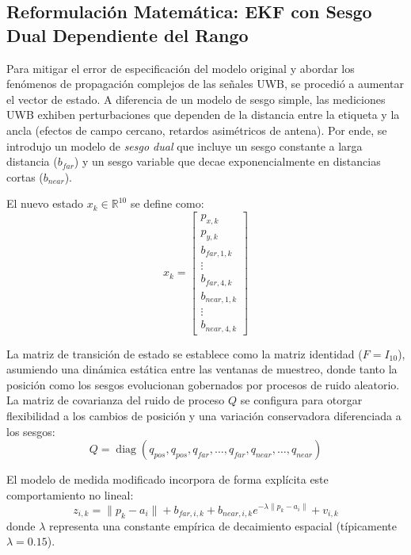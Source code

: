 \subsection{Reformulación Matemática: EKF con Sesgo Dual Dependiente del Rango}
Para mitigar el error de especificación del modelo original y abordar los fenómenos de propagación complejos de las señales UWB, se procedió a aumentar el vector de estado. A diferencia de un modelo de sesgo simple, las mediciones UWB exhiben perturbaciones que dependen de la distancia entre la etiqueta y la ancla (efectos de campo cercano, retardos asimétricos de antena). Por ende, se introdujo un modelo de \textit{sesgo dual} que incluye un sesgo constante a larga distancia ($b_{far}$) y un sesgo variable que decae exponencialmente en distancias cortas ($b_{near}$).

El nuevo estado $x_k \in \mathbb{R}^{10}$ se define como:
\begin{equation}
    x_k = \begin{bmatrix} p_{x,k} \\ p_{y,k} \\ b_{far,1,k} \\ \vdots \\ b_{far,4,k} \\ b_{near,1,k} \\ \vdots \\ b_{near,4,k} \end{bmatrix}
\end{equation}

La matriz de transición de estado se establece como la matriz identidad ($F = I_{10}$), asumiendo una dinámica estática entre las ventanas de muestreo, donde tanto la posición como los sesgos evolucionan gobernados por procesos de ruido aleatorio. La matriz de covarianza del ruido de proceso $Q$ se configura para otorgar flexibilidad a los cambios de posición y una variación conservadora diferenciada a los sesgos:
\begin{equation}
    Q = \operatorname{diag}(q_{pos}, q_{pos}, q_{far}, \dots, q_{far}, q_{near}, \dots, q_{near})
\end{equation}

El modelo de medida modificado incorpora de forma explícita este comportamiento no lineal:
\begin{equation}
    z_{i,k} = \lVert p_k - a_i \rVert + b_{far,i,k} + b_{near,i,k} e^{-\lambda \lVert p_k - a_i \rVert} + v_{i,k}
\end{equation}
donde $\lambda$ representa una constante empírica de decaimiento espacial (típicamente $\lambda = 0.15$).

